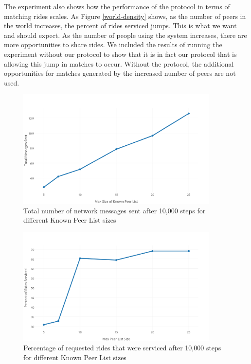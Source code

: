 \documentclass[letterpaper,11pt,twocolumn]{article}
\begin{document}
The experiment also shows how the performance of the protocol in terms of matching rides scales. As Figure \ref{world-density} shows, as the number of peers in the world increases, the percent of rides serviced jumps. This is what we want and should expect. As the number of people using the system increases, there are more opportunities to share rides. We included the results of running the experiment without our protocol to show that it is in fact our protocol that is allowing this jump in matches to occur. Without the protocol, the additional opportunities for matches generated by the increased number of peers are not used. \\

\begin{figure}[ht]
  \centering
   \includegraphics[width=0.9\textwidth]{images/messages_v_pl_size.png}     
   \caption{Total number of network messages sent after 10,000 steps for different Known Peer List sizes
           \label{messages-v-pls}}
\end{figure} 

\begin{figure}[ht]
  \centering
   \includegraphics[width=0.9\textwidth]{images/ratio_v_pls.png}     
   \caption{Percentage of requested rides that were serviced after 10,000 steps for different Known Peer List sizes
           \label{ratio-v-pls}}
\end{figure} 
\end{document}
